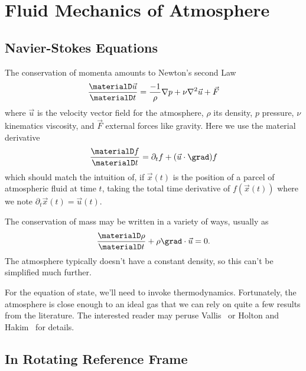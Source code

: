 \section{Fluid Mechanics of Atmosphere}

\subsection{Navier-Stokes Equations}

The conservation of momenta amounts to Newton's second Law
\begin{equation}
  \frac{\materialD\vec{u}}{\materialD t}
  =\frac{-1}{\rho}\nabla p + \nu\nabla^{2}\vec{u} + \vec{F}
\end{equation}
where $\vec{u}$ is the velocity vector field for the atmosphere, $\rho$
its density, $p$ pressure, $\nu$ kinematics viscosity, and $\vec{F}$
external forces like gravity. Here we use the material derivative
\begin{equation}
  \frac{\materialD f}{\materialD t} = \partial_{t}f + (\vec{u}\cdot\grad)f
\end{equation}
which should match the intuition of, if $\vec{x}(t)$ is the position of
a parcel of atmospheric fluid at time $t$, taking the total time
derivative of $f(\vec{x}(t))$ where we note
$\partial_{t}\vec{x}(t)=\vec{u}(t)$.

The conservation of mass may be written in a variety of ways, usually as
\begin{equation}
  \frac{\materialD\rho}{\materialD t}+\rho\grad\cdot\vec{u}=0.
\end{equation}
The atmosphere typically doesn't have a constant density, so this can't
be simplified much further.

For the equation of state, we'll need to invoke thermodynamics.
Fortunately, the atmosphere is close enough to an ideal gas that we can
rely on quite a few results from the literature. The interested reader
may peruse Vallis~\cite{vallis_2017} or Holton and
Hakim~\cite{holton2013dynamicMeteorology} for details.

\subsection{In Rotating Reference Frame}

